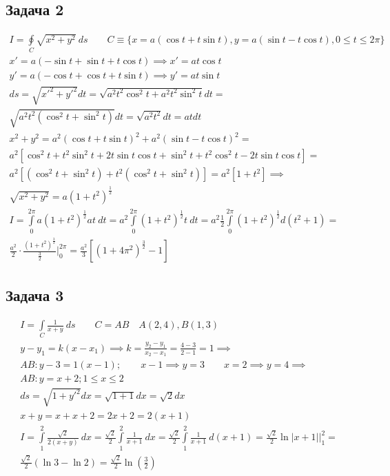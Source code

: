 \documentclass[a4paper,fleqn,12pt]{article}
\theoremstyle{definition}
\begin{document}
\subsection*{Задача 2}
\begin{gather*}
I = \oint\limits_{C} \sqrt{x^2 + y^2} \ ds \qquad 
C \equiv \{x = a(\cos t + t \sin t), y = a(\sin t - t\cos t), 0 \leq t \leq 2\pi \} \\
x' = a(-\sin t + \sin t + t\cos t) \implies x' = at\cos t \\
y'= a(- \cos t + \cos t + t\sin t) \implies y' = at\sin t \\
ds = \sqrt{x'^2 + y'^2} dt = \sqrt{a^2t^2 \cos^2 t + a^2t^2 \sin^2 t}dt = \\
\sqrt{a^2t^2(\cos^2 t + \sin^2 t)}dt = \sqrt{a^2t^2}dt = atdt \\
x^2 + y^2 = a^2(\cos t + t \sin t)^2 + a^2(\sin t - t\cos t)^2 = \\
a^2 \left[\cos^2 t + t^2\sin^2t + 2t\sin t \cos t + \sin^2 t + t^2\cos^2 t - 2t\sin t \cos t \right] = \\
a^2 \left[ (\cos^2 t + \sin^2 t) + t^2(\cos^2 t + \sin^2 t)\right] = a^2 \left[1+t^2 \right] \implies \\
\sqrt{x^2+y^2} = a(1+t^2)^{\frac{1}{2}} \\
I = \int\limits_0 ^{2\pi}  a(1+t^2)^{\frac{1}{2}} at \ dt = 
a^2 \int\limits_0 ^{2\pi} (1+t^2)^{\frac{1}{2}} t \ dt = 
a^2 \frac{1}{2} \int\limits_0 ^{2\pi} (1+t^2)^{\frac{1}{2}} d(t^2 + 1) =  \\
\frac{a^2}{2} \cdot \frac{(1+t^2)^{\frac{3}{2}}}{\frac{3}{2}} \Big|_0 ^{2\pi} = 
\frac{a^2}{3} \left[(1+4\pi^2)^{\frac{3}{2}} - 1 \right]
\end{gather*}

\subsection*{Задача 3}
\begin{gather*}
I = \int\limits_{C} \frac{1}{x+y} \ ds \qquad C=AB \quad A(2,4), B(1,3)\\
y-y_1 = k(x-x_1) \implies k = \frac{y_2-y_1}{x_2 - x_1} = \frac{4-3}{2-1} = 1 \implies \\
AB: y-3 = 1(x-1); \qquad x-1 \implies y = 3 \qquad x=2 \implies y=4 \implies \\
AB: y=x+2; 1 \leq x \leq 2 \\
ds = \sqrt{1 + y'^2}dx = \sqrt{1+1}dx = \sqrt{2} dx \\
x+y = x +x+2 = 2x+2 = 2(x+1) \\
I = \int\limits_1 ^2 \frac{\sqrt{2}}{2(x+y)} \ dx =
\frac{\sqrt{2}}{2} \int\limits_1 ^2 \frac{1}{x+1} \ dx =
\frac{\sqrt{2}}{2} \int\limits_1 ^2 \frac{1}{x+1} \ d(x+1) = 
\frac{\sqrt{2}}{2} \ln |x+1| \Big|_1 ^2 = \\
\frac{\sqrt{2}}{2} (\ln 3 - \ln 2) =  
\frac{\sqrt{2}}{2} \ln \left( \frac{3}{2} \right)
\end{gather*}
\end{document}
